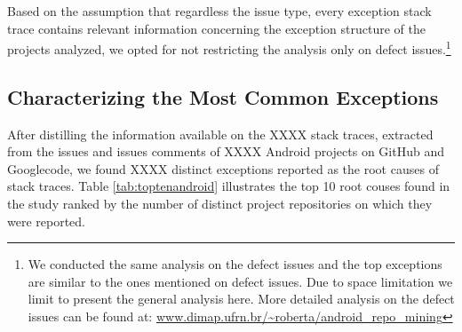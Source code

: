 \documentclass[conference]{IEEEtran}
\begin{document}
Based on the assumption that regardless the issue type, every exception stack
trace contains relevant information concerning the exception structure of the
projects analyzed, we opted for not restricting the analysis only on defect
issues.\footnote{We conducted the same analysis on the defect issues and the top
exceptions are similar to the ones mentioned on defect issues. Due to space
limitation we limit to present the general analysis here. More detailed analysis
on the defect issues can be found at:
\url{www.dimap.ufrn.br/~roberta/android_repo_mining}}

\subsection{Characterizing the Most Common Exceptions}

After distilling the information available on the XXXX  stack traces, extracted from the 
issues and issues comments of XXXX Android projects on GitHub and Googlecode,  
we found XXXX  distinct exceptions reported as the root causes of stack traces.
Table \ref{tab:toptenandroid} illustrates the top 10 root couses found in the study ranked by the number of distinct
project repositories on which they were reported. 
\end{document}
